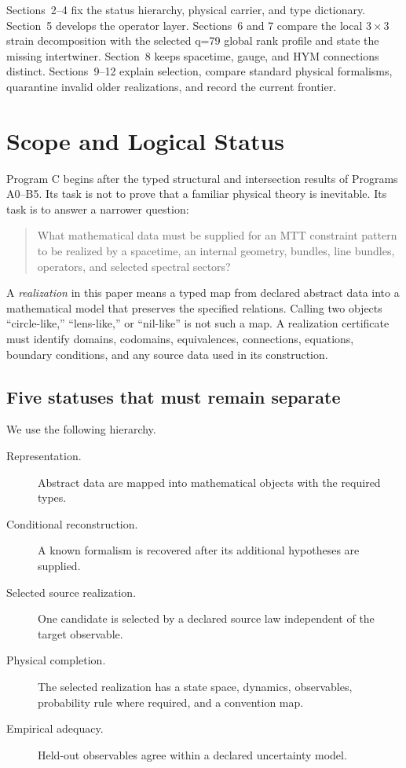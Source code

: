 \documentclass[11pt]{article}
\begin{document}
Sections~2--4 fix the status hierarchy, physical carrier, and type dictionary.
Section~5 develops the operator layer.  Sections~6 and 7 compare the local
$3\times3$ strain decomposition with the selected q=79 global rank profile
and state the missing intertwiner.  Section~8 keeps spacetime, gauge, and HYM
connections distinct.  Sections~9--12 explain selection, compare standard
physical formalisms, quarantine invalid older realizations, and record the
current frontier.

\section{Scope and Logical Status}

Program C begins after the typed structural and intersection results of
Programs A0--B5.  Its task is not to prove that a familiar physical theory is
inevitable.  Its task is to answer a narrower question:
\begin{quote}
What mathematical data must be supplied for an MTT constraint pattern to be
realized by a spacetime, an internal geometry, bundles, line bundles,
operators, and selected spectral sectors?
\end{quote}

A \emph{realization} in this paper means a typed map from declared abstract
data into a mathematical model that preserves the specified relations.
Calling two objects ``circle-like,'' ``lens-like,'' or ``nil-like'' is not
such a map.  A realization certificate must identify domains, codomains,
equivalences, connections, equations, boundary conditions, and any source
data used in its construction.

\subsection{Five statuses that must remain separate}

We use the following hierarchy.
\begin{description}
\item[Representation.]
Abstract data are mapped into mathematical objects with the required types.
\item[Conditional reconstruction.]
A known formalism is recovered after its additional hypotheses are supplied.
\item[Selected source realization.]
One candidate is selected by a declared source law independent of the target
observable.
\item[Physical completion.]
The selected realization has a state space, dynamics, observables,
probability rule where required, and a convention map.
\item[Empirical adequacy.]
Held-out observables agree within a declared uncertainty model.
\end{description}
\end{document}
